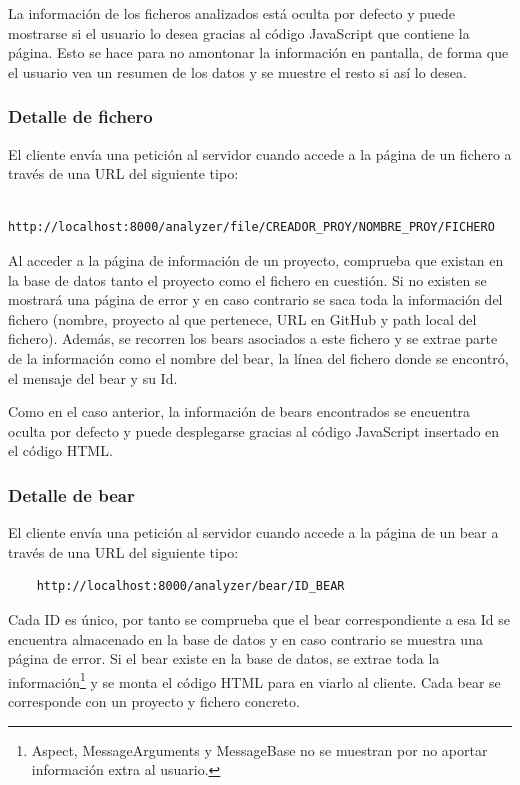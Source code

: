 \documentclass[a4paper, 12pt]{book}
\begin{document}
La información de los ficheros analizados está oculta por defecto y puede mostrarse si el usuario lo desea gracias al código JavaScript que contiene la página. Esto se hace para no amontonar la información en pantalla, de forma que el usuario vea un resumen de los datos y se muestre el resto si así lo desea.

\subsubsection{Detalle de fichero}
\label{sec:section12.4.2}
El cliente envía una petición al servidor cuando accede a la página de un fichero a través de una URL del siguiente tipo:

{\footnotesize
\begin{verbatim}
    http://localhost:8000/analyzer/file/CREADOR_PROY/NOMBRE_PROY/FICHERO
\end{verbatim}
}

Al acceder a la página de información de un proyecto, comprueba que existan en la base de datos tanto el proyecto como el fichero en cuestión. Si no existen se mostrará una página de error y en caso contrario se saca toda la información del fichero (nombre, proyecto al que pertenece, URL en GitHub y path local del fichero). Además, se recorren los bears asociados a este fichero y se extrae parte de la información como el nombre del bear, la línea del fichero donde se encontró, el mensaje del bear y su Id.

Como en el caso anterior, la información de bears encontrados se encuentra oculta por defecto y puede desplegarse gracias al código JavaScript insertado en el código HTML.

\subsubsection{Detalle de bear}
\label{sec:section12.4.3}
El cliente envía una petición al servidor cuando accede a la página de un bear a través de una URL del siguiente tipo:

{\footnotesize
\begin{verbatim}
    http://localhost:8000/analyzer/bear/ID_BEAR
\end{verbatim}
}

Cada ID es único, por tanto se comprueba que el bear correspondiente a esa Id se encuentra almacenado en la base de datos y en caso contrario se muestra una página de error. Si el bear existe en la base de datos, se extrae toda la información\footnote{Aspect, MessageArguments y MessageBase no se muestran por no aportar información extra al usuario.} y se monta el código HTML para en viarlo al cliente. Cada bear se corresponde con un proyecto y fichero concreto.
\end{document}
